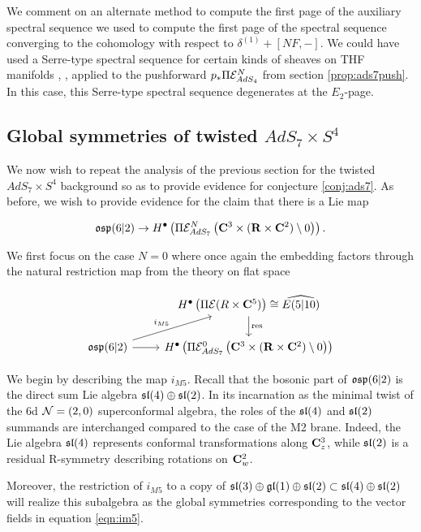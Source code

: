 \documentclass[../main.tex]{subfiles}
\begin{document}
\begin{rmk}\label{rmk:altss}
We comment on an alternate method to compute the first page of the auxiliary spectral sequence we used to compute the first page of the spectral sequence converging to the cohomology with respect to $\delta^{(1)} + [NF, - ]$. We could have used a Serre-type spectral sequence for certain kinds of sheaves on THF manifolds \cite{KamberTondeur}, \cite{KormanThesis}, applied to the pushforward $ p_* \Pi \mathcal{E}^N_{AdS_4}$ from section \ref{prop:ads7push}. In this case, this Serre-type spectral sequence degenerates at the $E_2$-page.
\end{rmk}

\subsection{Global symmetries of twisted $AdS_7 \times S^4$}
We now wish to repeat the analysis of the previous section for the twisted $AdS_7\times S^4$ background so as to provide evidence for conjecture \ref{conj:ads7}. As before, we wish to provide evidence for the claim that there is a Lie map 

\[\mathfrak{osp}(6|2)\to H^\bullet \left ( \Pi \mathcal{E}^N_{AdS_7} \left ( \mathbf{C}^3 \times (\mathbf{R}\times \mathbf{C}^2)\setminus 0 \right ) \right ).\]

We first focus on the case $N=0$ where once again the embedding factors through the natural restriction map from the theory on flat space

\[ 
\begin{tikzcd}
& H^\bullet \left ( \Pi \mc E (R\times \C^5)\right )\cong\widehat{E(5|10) }\ar[d, "\mr{res}"] \\
\mf{osp}(6|2)\ar[ur, "i_{M5}"]\ar[r] & H^\bullet \left ( \Pi \mc E^0_{AdS_7} \left ( \C^3 \times (\R\times \C^2)\setminus 0 \right ) \right )
\end{tikzcd}
\]

\parsec[s:m5embedding]
We begin by describing the map $i_{M5}$. Recall that the bosonic part of $\mathfrak{osp}(6|2)$ is the direct sum Lie algebra $\mathfrak{sl}(4) \oplus \mathfrak{sl}(2)$. In its incarnation as the minimal twist of the 6d $\mathcal{N}=(2,0)$ superconformal algebra,  the roles of the $\mathfrak{sl}(4)$ and $\mathfrak{sl}(2)$ summands are interchanged compared to the case of the M2 brane. Indeed, the Lie algebra $\mathfrak{sl}(4)$ represents conformal transformations along $\mathbf{C}^3_z$, while $\mathfrak{sl}(2)$ is a residual R-symmetry describing rotations on $\mathbf{C}^2_w$.

Moreover, the restriction of $i_{M5}$ to a copy of $\mathfrak{sl}(3)\oplus\mathfrak{gl}(1)\oplus \mathfrak{sl}(2)\subset \mathfrak{sl}(4) \oplus \mathfrak{sl}(2)$ will realize this subalgebra as the global symmetries corresponding to the vector fields in equation \ref{eqn:im5}. 
\end{document}
